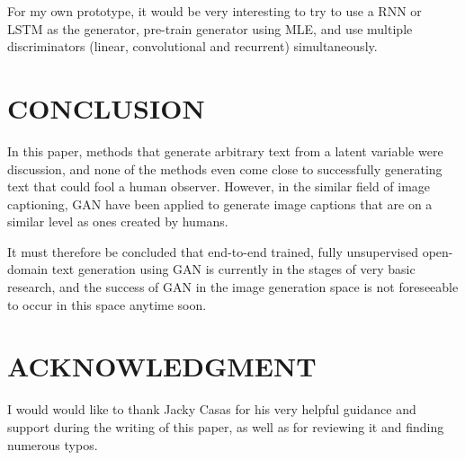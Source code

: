 \documentclass[a4paper,conference]{IEEEtran}
\begin{document}
For my own prototype, it would be very interesting to try to use a RNN or LSTM as the generator, pre-train generator using MLE, and use multiple discriminators (linear, convolutional and recurrent) simultaneously. 

\section{CONCLUSION}
In this paper, methods that generate arbitrary text from a latent variable were discussion, and none of the methods even come close to successfully generating text that could fool a human observer. However, in the similar field of image captioning, GAN have been applied to generate image captions that are on a similar level as ones created by humans.

It must therefore be concluded that end-to-end trained, fully unsupervised open-domain text generation using GAN is currently in the stages of very basic research, and the success of GAN in the image generation space is not foreseeable to occur in this space anytime soon.

\section*{ACKNOWLEDGMENT}

I would would like to thank Jacky Casas for his very helpful guidance and support during the writing of this paper, as well as for reviewing it and finding numerous typos.


%
%
\end{document}
